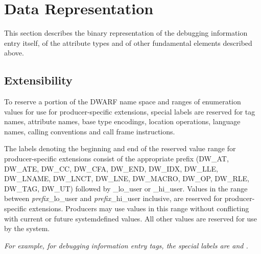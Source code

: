 \chapter{Data Representation}
\label{datarep:datarepresentation}

This section describes the binary representation of the
debugging information entry itself, of the attribute types
and of other fundamental elements described above.

\bb
\section{Extensibility}
\eb
\label{datarep:extensibility}
To reserve a portion of the DWARF name space and ranges of
enumeration values for use for 
\bb
producer-specific 
\eb
extensions,
special labels are reserved for tag names, attribute names,
base type encodings, location operations, language names,
calling conventions and call frame instructions.

The labels denoting the beginning and end of the 
\hypertarget{chap:DWXXXlohiuser}{reserved value range} for 
\bb
producer-specific 
\eb
extensions consist of the
appropriate prefix 
(\DWATlouserMARK{}\DWAThiuserMARK{}DW\_AT, 
\DWATElouserMARK{}\DWATEhiuserMARK{}DW\_ATE, 
\DWCClouserMARK{}\DWCChiuserMARK{}DW\_CC, 
\DWCFAlouserMARK{}\DWCFAhiuserMARK{}DW\_CFA, 
\DWENDlouserMARK{}\DWENDhiuserMARK{}DW\_END, 
\DWIDXlouserMARK{}\DWIDXhiuserMARK{}DW\_IDX, 
\bb
\DWLLElouserMARK{}\DWLLEhiuserMARK{}DW\_LLE,
\DWLNAMElouserMARK{}\DWLNAMEhiuserMARK{}DW\_LNAME,
\eb 
\DWLNCTlouserMARK{}\DWLNCThiuserMARK{}DW\_LNCT, 
\DWLNElouserMARK{}\DWLNEhiuserMARK{}DW\_LNE, 
\DWMACROlouserMARK{}\DWMACROhiuserMARK{}DW\_MACRO,
\DWOPlouserMARK{}\DWOPhiuserMARK{}DW\_OP,
\bb
\DWRLElouserMARK{}\DWRLEhiuserMARK{}DW\_RLE,
\eb
\DWTAGlouserMARK{}\DWTAGhiuserMARK{}DW\_TAG,
\DWUTlouserMARK{}\DWUThiuserMARK{}DW\_UT)
followed by \_lo\_user or \_hi\_user. 
Values in the  range between \textit{prefix}\_lo\_user 
and \textit{prefix}\_hi\_user inclusive,
are reserved for 
\bb
producer-specific extensions. Producers
\eb
may use values in this range without conflicting with current or
future system\dash defined values. All other values are reserved
for use by the system.

\textit{For example, for debugging information entry
tags, the special labels are \DWTAGlouserNAME{} and \DWTAGhiuserNAME.}

